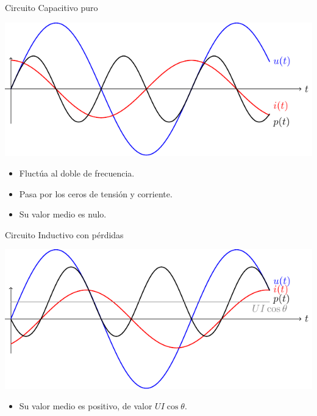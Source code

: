 \documentclass[xcolor={usenames,svgnames,dvipsnames}]{beamer}
\begin{document}
\begin{frame}[label={sec:org39b336e}]{Circuito Capacitivo puro}
\begin{center}
\includegraphics[width=.9\linewidth]{../figs/capacitivoPuroPotencia.pdf}
\end{center}

\begin{itemize}
\item Fluctúa al doble de frecuencia.
\item Pasa por los ceros de tensión y corriente.
\item Su valor medio es nulo.
\end{itemize}
\end{frame}

\begin{frame}[label={sec:org36ed404}]{Circuito Inductivo con pérdidas}
\begin{center}
\includegraphics[width=.9\linewidth]{../figs/inductivoPotencia.pdf}
\end{center}

\begin{itemize}
\item Su valor medio es positivo, de valor \(U I \cos \theta\).
\end{itemize}
\end{frame}
\end{document}
